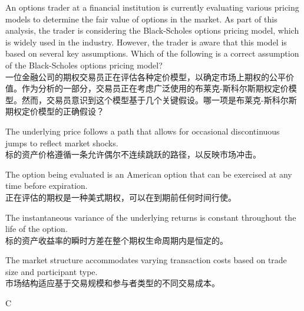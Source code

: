 \documentclass{article}
\newcounter{question} %
\begin{document}
\begin{question}
    An options trader at a financial institution is currently evaluating various pricing models to determine the fair value of options in the market. As part of this analysis, the trader is considering the Black-Scholes options pricing model, which is widely used in the industry. However, the trader is aware that this model is based on several key assumptions. Which of the following is a correct assumption of the Black-Scholes options pricing model?\\
    一位金融公司的期权交易员正在评估各种定价模型，以确定市场上期权的公平价值。作为分析的一部分，交易员正在考虑广泛使用的布莱克-斯科尔斯期权定价模型。然而，交易员意识到这个模型基于几个关键假设。哪一项是布莱克-斯科尔斯期权定价模型的正确假设？
\end{question}

\begin{choices}
    \item The underlying price follows a path that allows for occasional discontinuous jumps to reflect market shocks. \\
    标的资产价格遵循一条允许偶尔不连续跳跃的路径，以反映市场冲击。
    \item The option being evaluated is an American option that can be exercised at any time before expiration. \\
    正在评估的期权是一种美式期权，可以在到期前任何时间行使。
    \item The instantaneous variance of the underlying returns is constant throughout the life of the option. \\
    标的资产收益率的瞬时方差在整个期权生命周期内是恒定的。
    \item The market structure accommodates varying transaction costs based on trade size and participant type. \\
    市场结构适应基于交易规模和参与者类型的不同交易成本。
\end{choices}

\begin{correctanswer}
    C
\end{correctanswer}
\end{document}
